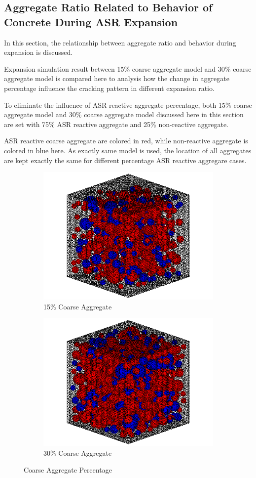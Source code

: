 \clearpage
\subsection{Aggregate Ratio Related to Behavior of Concrete During ASR Expansion}
In this section, the relationship between aggregate ratio and behavior during expansion is discussed.

Expansion simulation result between 15\% coarse aggregate model and 30\% coarse aggregate model is compared here to analysis how the change in aggregate percentage influence the cracking pattern in different expansion ratio.

To eliminate the influence of ASR reactive aggregate percentage, both 15\% coarse aggregate model and 30\% coarse aggregate model discussed here in this section are set with 75\% ASR  reactive aggregate and 25\% non-reactive aggregate.

ASR reactive coarse aggregate are colored in red, while non-reactive aggregate is colored in blue here. As exactly same model is used, the location of all aggregates are kept exactly the same for different percentage ASR reactive aggregare cases.

\begin{figure}[!h]
\centering
\begin{subfigure}{.5\textwidth}
  \centering
  \includegraphics[width=.6\linewidth]{Files/Aggregate/A15P75.png}
  \caption{15\% Coarse Aggregate}
  \label{fig:A15_model}
\end{subfigure}%
\begin{subfigure}{.5\textwidth}
  \centering
  \includegraphics[width=.6\linewidth]{Files/Aggregate/A30P75.png}
  \caption{30\% Coarse Aggregate}
  \label{fig:A15_model}
\end{subfigure}
\caption{Coarse Aggregate Percentage}
\label{fig:Aggregate_Percentage}
\end{figure}


